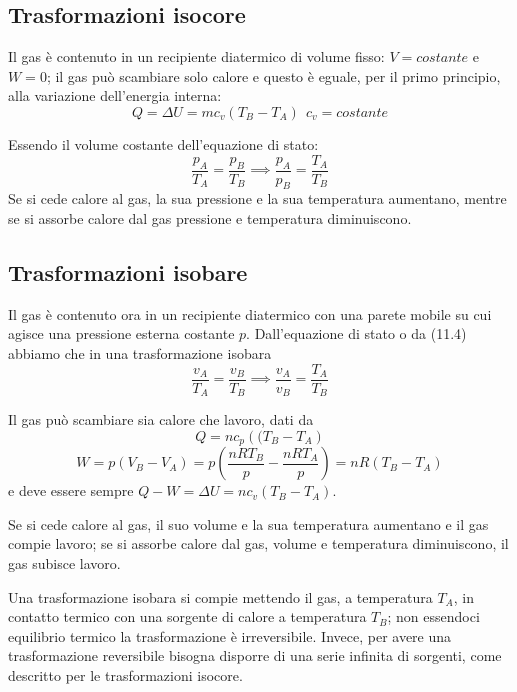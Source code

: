 \documentclass[class=book, crop=false, oneside, 12pt]{standalone}
\begin{document}
\subsection{Trasformazioni isocore}

Il gas è contenuto in un recipiente diatermico di volume fisso: \(V = costante\) e \(W = 0\); il gas può scambiare solo calore e questo è eguale, per il primo principio, alla variazione dell'energia interna:
\begin{equation*}
    Q = \Delta U = m c_v (T_B - T_A) \ \  c_v = costante
\end{equation*}

Essendo il volume costante dell'equazione di stato:
\begin{equation*}
    \frac{p_A}{T_A} = \frac{p_B}{T_B} \implies \frac{p_A}{p_B} = \frac{T_A}{T_B}
\end{equation*}
Se si cede calore al gas, la sua pressione e la sua temperatura aumentano, mentre se si assorbe calore dal gas pressione e temperatura diminuiscono.

\subsection{Trasformazioni isobare}

Il gas è contenuto ora in un recipiente diatermico con una parete mobile su cui agisce una pressione esterna costante \(p\).
Dall'equazione di stato o da (11.4) abbiamo che in una trasformazione isobara %
\begin{equation*}
    \frac{v_A}{T_A} = \frac{v_B}{T_B} \implies \frac{v_A}{v_B} = \frac{T_A}{T_B}
\end{equation*}

Il gas può scambiare sia calore che lavoro, dati da 
\begin{equation*}
    Q = n c_p \left((T_B - T_A\right)
\end{equation*}
\begin{equation*}
    W = p (V_B - V_A) = p \left(\frac{n R T_B}{p} - \frac{n R T_A}{p}\right) = n R \left(T_B - T_A\right) 
\end{equation*}
e deve essere sempre \(Q - W = \Delta U = n c_v (T_B - T_A)\).

Se si cede calore al gas, il suo volume e la sua temperatura aumentano e il gas compie lavoro; se si assorbe calore dal gas, volume e temperatura diminuiscono, il gas subisce lavoro.

Una trasformazione isobara si compie mettendo il gas, a temperatura \(T_A\), in contatto termico con una sorgente di calore a temperatura \(T_B\); non essendoci equilibrio termico la trasformazione è irreversibile. 
Invece, per avere una trasformazione reversibile bisogna disporre di una serie infinita di sorgenti, come descritto per le trasformazioni isocore. 
\end{document}

